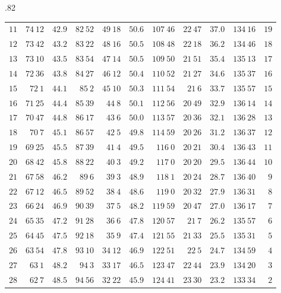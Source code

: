 \begin{GaussVICeresFrame}{.82}
{\begin{tabular}{r@{\GaussVICeresRule}r|r|r@{\GaussVICeresRule}r|r|r@{\GaussVICeresRule}r|r|r@{\GaussVICeresRule}r}
$11$ & $74\ 12$ & $42.9$ & $82\ 52$ & $49\ 18$ & $50.6$ & $107\ 46$ & $22\ 47$ & $37.0$ & $134\ 16$ & $19$ \\
$12$ & $73\ 42$ & $43.2$ & $83\ 22$ & $48\ 16$ & $50.5$ & $108\ 48$ & $22\ 18$ & $36.2$ & $134\ 46$ & $18$ \\
$13$ & $73\ 10$ & $43.5$ & $83\ 54$ & $47\ 14$ & $50.5$ & $109\ 50$ & $21\ 51$ & $35.4$ & $135\ 13$ & $17$ \\
$14$ & $72\ 36$ & $43.8$ & $84\ 27$ & $46\ 12$ & $50.4$ & $110\ 52$ & $21\ 27$ & $34.6$ & $135\ 37$ & $16$ \\
$15$ & $72\ 1$ & $44.1$ & $85\ 2$ & $45\ 10$ & $50.3$ & $111\ 54$ & $21\ 6$ & $33.7$ & $135\ 57$ & $15$ \\[3pt]
$16$ & $71\ 25$ & $44.4$ & $85\ 39$ & $44\ 8$ & $50.1$ & $112\ 56$ & $20\ 49$ & $32.9$ & $136\ 14$ & $14$ \\
$17$ & $70\ 47$ & $44.8$ & $86\ 17$ & $43\ 6$ & $50.0$ & $113\ 57$ & $20\ 36$ & $32.1$ & $136\ 28$ & $13$ \\
$18$ & $70\ 7$ & $45.1$ & $86\ 57$ & $42\ 5$ & $49.8$ & $114\ 59$ & $20\ 26$ & $31.2$ & $136\ 37$ & $12$ \\
$19$ & $69\ 25$ & $45.5$ & $87\ 39$ & $41\ 4$ & $49.5$ & $116\ 0$ & $20\ 21$ & $30.4$ & $136\ 43$ & $11$ \\
$20$ & $68\ 42$ & $45.8$ & $88\ 22$ & $40\ 3$ & $49.2$ & $117\ 0$ & $20\ 20$ & $29.5$ & $136\ 44$ & $10$ \\[3pt]
$21$ & $67\ 58$ & $46.2$ & $89\ 6$ & $39\ 3$ & $48.9$ & $118\ 1$ & $20\ 24$ & $28.7$ & $136\ 40$ & $9$ \\
$22$ & $67\ 12$ & $46.5$ & $89\ 52$ & $38\ 4$ & $48.6$ & $119\ 0$ & $20\ 32$ & $27.9$ & $136\ 31$ & $8$ \\
$23$ & $66\ 24$ & $46.9$ & $90\ 39$ & $37\ 5$ & $48.2$ & $119\ 59$ & $20\ 47$ & $27.0$ & $136\ 17$ & $7$ \\
$24$ & $65\ 35$ & $47.2$ & $91\ 28$ & $36\ 6$ & $47.8$ & $120\ 57$ & $21\ 7$ & $26.2$ & $135\ 57$ & $6$ \\
$25$ & $64\ 45$ & $47.5$ & $92\ 18$ & $35\ 9$ & $47.4$ & $121\ 55$ & $21\ 33$ & $25.5$ & $135\ 31$ & $5$ \\[3pt]
$26$ & $63\ 54$ & $47.8$ & $93\ 10$ & $34\ 12$ & $46.9$ & $122\ 51$ & $22\ 5$ & $24.7$ & $134\ 59$ & $4$ \\
$27$ & $63\ 1$ & $48.2$ & $94\ 3$ & $33\ 17$ & $46.5$ & $123\ 47$ & $22\ 44$ & $23.9$ & $134\ 20$ & $3$ \\
$28$ & $62\ 7$ & $48.5$ & $94\ 56$ & $32\ 22$ & $45.9$ & $124\ 41$ & $23\ 30$ & $23.2$ & $133\ 34$ & $2$ \\

\end{tabular}}
\end{GaussVICeresFrame}
